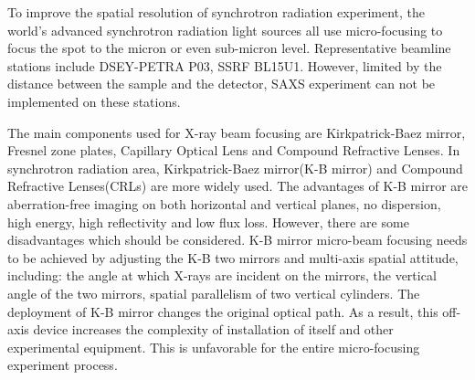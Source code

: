 \documentclass{Head}
\begin{document}
To improve the spatial resolution of synchrotron radiation experiment, the world’s advanced synchrotron radiation light sources all use micro-focusing to focus the spot to the micron or even sub-micron level.
Representative beamline stations include DSEY-PETRA \uppercase\expandafter{} P03, SSRF BL15U1.
However, limited by the distance between the sample and the detector, SAXS experiment can not be implemented on these stations.


The main components used for X-ray beam focusing are Kirkpatrick-Baez mirror, Fresnel zone plates, Capillary Optical Lens and Compound Refractive Lenses.
In synchrotron radiation area, Kirkpatrick-Baez mirror(K-B mirror) and Compound Refractive Lenses(CRLs) are more widely used.
The advantages of K-B mirror are aberration-free imaging on both horizontal and vertical planes, no dispersion, high energy, high reflectivity and low flux loss.
However, there are some disadvantages which should be considered.
K-B mirror micro-beam focusing needs to be achieved by adjusting the K-B two mirrors and multi-axis spatial attitude, including: the angle at which X-rays are incident on the mirrors, the vertical angle of the two mirrors, spatial parallelism of two vertical cylinders.
The deployment of K-B mirror changes the original optical path.
As a result, this off-axis device increases the complexity of installation of itself and other experimental equipment.
This is unfavorable for the entire micro-focusing experiment process.
\end{document}
